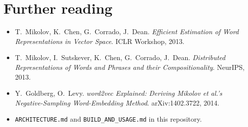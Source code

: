 \documentclass[11pt,a4paper]{article}
\newcommand{\code}[1]{\texttt{#1}}
\begin{document}
\section*{Further reading}
\begin{itemize}[nosep]
  \item T.~Mikolov, K.~Chen, G.~Corrado, J.~Dean. \emph{Efficient Estimation of Word
        Representations in Vector Space}. ICLR Workshop, 2013.
  \item T.~Mikolov, I.~Sutskever, K.~Chen, G.~Corrado, J.~Dean. \emph{Distributed
        Representations of Words and Phrases and their Compositionality}. NeurIPS, 2013.
  \item Y.~Goldberg, O.~Levy. \emph{word2vec Explained: Deriving Mikolov et al.'s
        Negative-Sampling Word-Embedding Method}. arXiv:1402.3722, 2014.
  \item \code{ARCHITECTURE.md} and \code{BUILD\_AND\_USAGE.md} in this repository.
\end{itemize}
\end{document}
